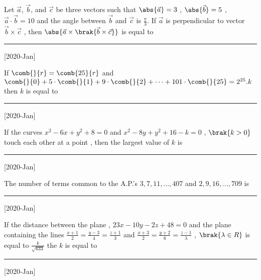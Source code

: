 \iffalse
    \title{2020}
    \author{EE24BTECH11011}
    \section{integer}
\fi 
 \item Let $\Vec{a}$, $\vec{b}$, and $\vec{c}$ be three vectors such that $\abs{\vec{ a}}=3$ , $\abs{\vec {b}}=5$ ,$\vec{a}\cdot \vec{b}= 10$ and the angle between $\vec{b}$ and $\vec{c}$ is $\frac{\pi}{3}$. If $\vec{a}$ is perpendicular to vector $\vec{b} \times \vec{c}$ ,  then $\abs{\vec{a} \times \brak{\vec{b}\times \vec{c}}}$ is equal to \rule{1cm}{0.15mm} \hfill[2020-Jan]\\

   \item If $\comb{}{r} = \comb{25}{r}$ and $\comb{}{0}+ 5 \cdot \comb{}{1}+ 9 \cdot \comb{}{2}+ \dots + 101 \cdot \comb{}{25} = 2^{25}. k $ then $k$ is equal to \rule{1cm}{0.15mm}\hfill[2020-Jan] \\


   \item If the curves $x^2-6x+y^2+8=0$ and $x^2-8y+y^2+16-k=0$ , $\brak{k>0}$ touch each other at a point , then the largest value of $k$ is \rule{1cm}{0.15mm}\hfill[2020-Jan] \\

   \item The number of terms common to the A.P.'s $3,7,11,\dots , 407$ and $2,9,16,\dots , 709$ is \rule{1cm}{0.15mm}\hfill[2020-Jan] \\


   \item If the distance between the plane , $23x-10y-2z+48=0$ and the plane containing the lines $\frac{x+1}{2} = \frac{y-3}{4} = \frac{z+1}{3}$ and $\frac{x+3}{2} = \frac{y+2}{6} = \frac{z-1}{\lambda}$ , $\brak{\lambda \in R}$ is equal to $\frac{k}{\sqrt{633}}$ the $k$ is equal to \rule{1cm}{0.15mm}\hfill[2020-Jan] \\

